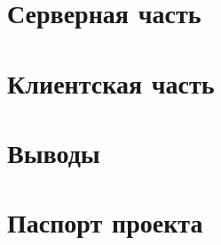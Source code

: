 \documentclass[a4paper, 14pt]{extarticle}
\begin{document}
\newpage


\section{Серверная часть} %

\newpage


\section{Клиентская часть} %

\newpage


\section{Выводы}

\newpage


\section{Паспорт проекта}
\end{document}
